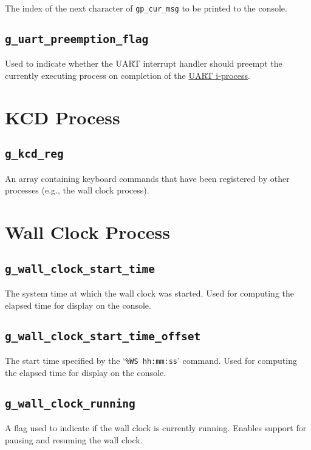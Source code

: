 \documentclass[12pt]{report}
\begin{document}
The index of the next character of \texttt{gp_cur_msg} to be printed to the console.

\subsection{\texttt{g_uart_preemption_flag}}

Used to indicate whether the UART interrupt handler should preempt the currently executing process on completion of the \hyperref[subsec:UART I-Process]{UART i-process}.

\section{KCD Process}

\subsection{\texttt{g_kcd_reg}}

An array containing keyboard commands that have been registered by other processes (e.g., the wall clock process).

\section{Wall Clock Process}

\subsection{\texttt{g_wall_clock_start_time}}

The system time at which the wall clock was started. Used for computing the elapsed time for display on the console.

\subsection{\texttt{g_wall_clock_start_time_offset}}

The start time specified by the `\texttt{\%WS hh:mm:ss}' command. Used for computing the elapsed time for display on the console.

\subsection{\texttt{g_wall_clock_running}}

A flag used to indicate if the wall clock is currently running. Enables support for pausing and resuming the wall clock.
\end{document}
